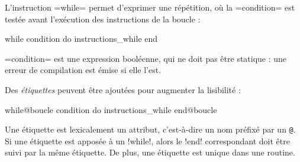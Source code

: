 L'instruction \plm=while= permet d'exprimer une répétition, où la \plm=condition= est testée avant l'exécution des instructions de la boucle :
\begin{PLM}
while condition do
  instructions_while
end
\end{PLM}

\plm=condition= est une expression booléenne, qui ne doit pas être statique : une erreur de compilation est émise si elle l'est.

Des \emph{étiquettes} peuvent être ajoutées pour augmenter la lisibilité :
\begin{PLM}
while@boucle condition do
  instructions_while
end@boucle
\end{PLM}

Une étiquette est lexicalement un attribut, c'est-à-dire un nom préfixé par un \texttt{@}. Si une étiquette est apposée à un \plm!while!, alors le \plm!end! correspondant doit être suivi par la même étiquette. De plus, une étiquette est unique dans une routine.

